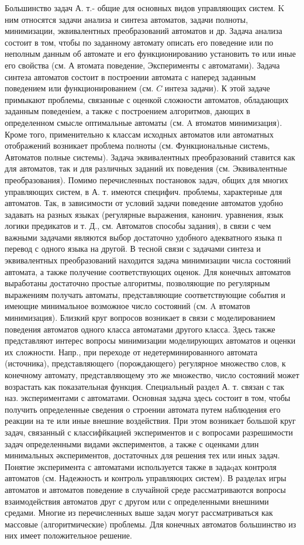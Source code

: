 \documentclass[10pt]{article}
\begin{document}
Большинство задач А. т.- общие для основных видов управляющих систем. $\mathrm{K}$ ним относятся задачи анализа и синтеза автоматов, задачи полноты, минимизации, эквивалентных преобразований автоматов и др. Задача анализа состоит в том, чтобы по заданному автомату описать его поведение или по неполным данным об автомате и его функционированию установить тө или иные его свойства (см. А втомата поведение, Эксперименты с автоматами). Задача синтеза автоматов состоит в построении автомата с наперед заданным поведением или функционированием (см. $C$ интеза задачи). К этой задаче примыкают проблемы, связанные с оценкой сложности автоматов, обладающих заданным поведеніем, а также с построением алгоритмов, дающих в определенном смысле оптимальные автоматы (см. A втоматов минимизация). Кроме того, применительно к классам исходных автоматов или автоматных отображений возникает проблема полноты (см. Функциональные системь, Автоматов полные системы). Задача эквивалентных преобразований ставится как для автоматов, так и для различных заданий их поведения (см. Эквивалентные преобразования). Помимо перечисленных постановок задач, общих для многих управляющих систем, в А. т. имеются специфич. проблемы, характерные для автоматов. Так, в зависимости от условий задачи поведение автоматов удобно задавать на разных языках (регулярные выражения, канонич. уравнения, язык логики предикатов и т. Д., см. Автоматов способы задания), в связи с чем важными задачами являются выбор достаточно удобного адекватного языка п перевод с одного языка на другой. В тесной связи с задачами синтеза и эквивалентных преобразований находится задача минимизации числа состояний автомата, а также получение соответствующих оценок. Для конечных автоматов выработаны достаточно простые алгоритмы, позволяющие по регулярным выражениям получать автоматы, представляющие соответствующие события и имеющие минимальное возможное число состояний (см. A втоматов минимизация). Близкий круг вопросов возникает в связи с моделированием поведения автоматов одного класса автоматами другого класса. Здесь также представляют интерес вопросы минимизации моделирующих автоматов и оценки их сложности. Напр., при переходе от недетерминированного автомата (источника), представляющего (порождающего) регулярное множество слов, к конечному автомату, представляющему это же множество, число состояний может возрастать как показательная функция. Специальный раздел А. т. связан с так наз. экспериментами с автоматами. Основная задача здесь состоит в том, чтобы получить определенные сведения о строении автомата путем наблюдения его реакции на те или иные внешние воздействия. При этом возникает большой круг задач, связанный с классифйкацией экспериментов и с вопросами разрешимости задач определенными видами әкспериментов, а также с оценками длин минимальных әкспериментов, достаточных для решения тех или иных задач. Понятие эксперимента с автоматами используется также в задаqах контроля автоматов (см. Надежность и контроль управляюцих систем). В разделах игры автоматов и автоматов поведение в случайной среде рассматриваются вопросы взаимодействия автоматов друг с другом или с определенными внешними средами. Многие из перечисленных выше задач могут рассматриваться как массовые (алгоритмические) проблемы. Для конечных автоматов большинство из них имеет положительное решение.
\end{document}
